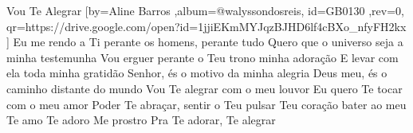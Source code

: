 \beginsong
{Vou Te Alegrar %
}[by={Aline Barros %
},album={@walyssondosreis},
id={GB0130 %
},rev={0}, %
qr={https://drive.google.com/open?id=1jjiEKmMYJqzBJHD6lf4cBXo_nfyFH2kx %
}]
\beginverse*
Eu me rendo a Ti perante os homens, perante tudo
Quero que o universo seja a minha testemunha
Vou erguer perante o Teu trono minha adoração
E levar com ela toda minha gratidão
\endverse
\beginverse*
Senhor, és o motivo da minha alegria
Deus meu, és o caminho distante do mundo
\endverse
\beginchorus
Vou Te alegrar com o meu louvor
Eu quero Te tocar com o meu amor
Poder Te abraçar, sentir o Teu pulsar
Teu coração bater ao meu
\endchorus
\beginverse*
Te amo
Te adoro
Me prostro
Pra Te adorar, Te alegrar
\endverse
\vspace{4em} %
\begin{comment}
\lstset{basicstyle=\scriptsize\bf} %
\tab{Solo 1}
\begin{lstlisting}
E|-----------------------------------------------------|
B|-----------------------------------------------------|
G|-----------------------------------------------------|
D|-----------------------------------------------------|
A|-----------------------------------------------------|
E|-----------------------------------------------------|
\end{lstlisting}
\end{comment}
 
